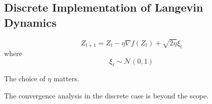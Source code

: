     \subsection{Discrete Implementation of Langevin Dynamics}
        \[ Z_{t+1} = Z_t - \eta\nabla f(Z_t) + \sqrt{2\eta}\xi_t \]
        where
        \[ \xi_t \sim \mathcal{N}(0,1) \]
        \begin{remark}
            The choice of $\eta$ matters.
        \end{remark}

        The convergence analysis in the discrete case is beyond the scope.
